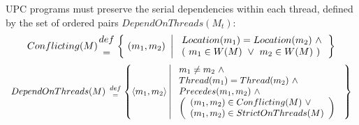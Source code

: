 \np UPC programs must preserve the serial dependencies within each thread, 
defined by the set of ordered pairs $DependOnThreads(M_t)$:
\[
Conflicting(M) {def \atop =} \left\{\ (m_1, m_2)\ \left|\ 
\begin{array}{lc} Location(m_1) = Location(m_2)\ \land \\
             (\ m_1 \in W(M)\ \lor\ m_2 \in W(M)\ ) \end{array} \right. \right\} 
\]
\[
\begin{array}{l}
DependOnThreads(M)\ {def \atop =}
\left\{ \langle m_1, m_2\rangle  \left|\ \begin{array}{l} 
 m_1 \neq m_2\ \land\ \\ Thread(m_1) = Thread(m_2)\ \land \\
 Precedes(m_1, m_2)\ \land \\
 \left( \begin{array}{l} (m_1, m_2) \in Conflicting(M)\ \lor \\
                         (m_1,m_2) \in StrictOnThreads(M) \end{array}\right)\ \end{array} \right. \right\} 
\end{array}
\]

